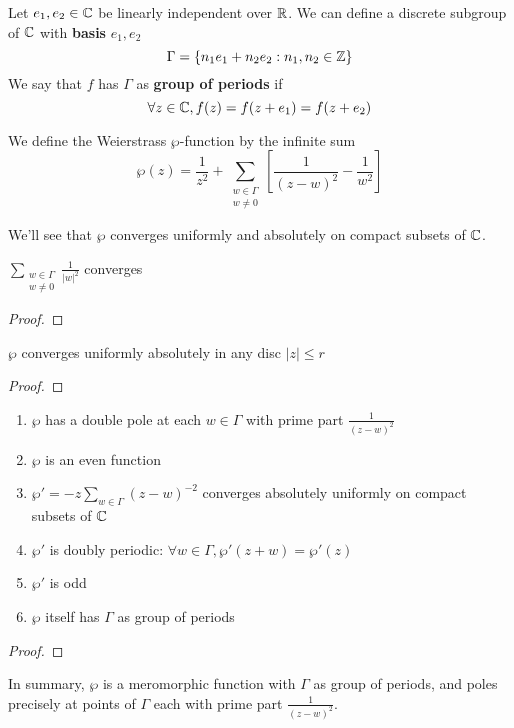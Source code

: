 \documentclass{article}
\begin{document}
\begin{definition}
Let \(e_1, e_2 \in \mathbb{C}\) be linearly independent over \(\mathbb{R}\). We can define a discrete subgroup of \(\mathbb{C}\) with \textbf{basis} \(e_1, e_2\)
\begin{equation}\Gamma = \{n_1e_1 + n_2e_2 : n_1, n_2 \in \mathbb{Z}\}\end{equation}
We say that \(f\) has \(\Gamma\) as \textbf{group of periods} if
\begin{equation}\forall z \in \mathbb{C}, f(z) = f(z + e_1) = f(z + e_2)\end{equation}
\end{definition}
\begin{definition}
We define the Weierstrass \(\wp\)-function by the infinite sum
\begin{equation}\wp(z) = \frac{1}{z^2} + \sum_{\substack{w \in \Gamma \\ w \neq 0}}\left[
  \frac{1}{(z - w)^2} - \frac{1}{w^2}
\right]\end{equation}
\end{definition}
We'll see that \(\wp\) converges uniformly and absolutely on compact subsets of \(\mathbb{C}\).
\begin{lemma}
\(\sum_{\substack{w \in \Gamma \\ w \neq 0}}\frac{1}{|w|^2}\) converges
\end{lemma}
\begin{proof}
\end{proof}
\begin{claim}
\(\wp\) converges uniformly absolutely in any disc \(|z| \leq r\)
\end{claim}
\begin{proof}
\end{proof}
\begin{claim}
\begin{enumerate}
  \item \(\wp\) has a double pole at each \(w \in \Gamma\) with prime part \(\frac{1}{(z - w)^2}\)
  \item \(\wp\) is an even function
  \item \(\wp' = -z\sum_{w \in \Gamma}(z - w)^{-2}\) converges absolutely uniformly on compact subsets of \(\mathbb{C}\)
  \item \(\wp'\) is doubly periodic: \(\forall w \in \Gamma, \wp'(z + w) = \wp'(z)\)
  \item \(\wp'\) is odd
  \item \(\wp\) itself has \(\Gamma\) as group of periods
\end{enumerate}
\end{claim}
\begin{proof}
\end{proof}
In summary, \(\wp\) is a meromorphic function with \(\Gamma\) as group of periods, and poles precisely at points of \(\Gamma\) each with prime part \(\frac{1}{(z - w)^2}\).
\end{document}
